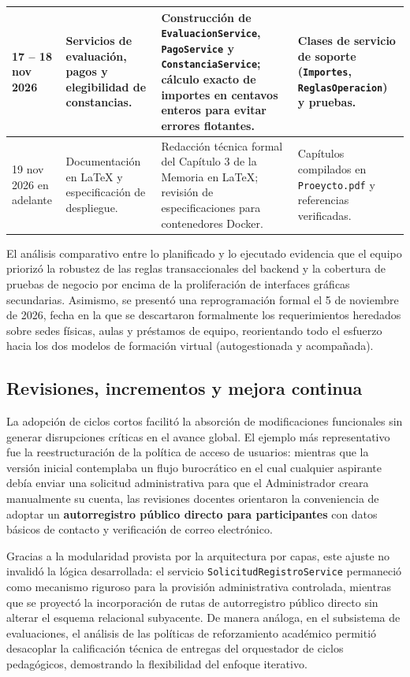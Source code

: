 \begin{table}[htbp]
\begin{tabularx}{\textwidth}{|p{2.6cm}|p{3.8cm}|X|p{3.2cm}|}
\hline
17 -- 18 nov 2026 & Servicios de evaluación, pagos y elegibilidad de constancias. & Construcción de \texttt{EvaluacionService}, \texttt{PagoService} y \texttt{ConstanciaService}; cálculo exacto de importes en centavos enteros para evitar errores flotantes. & Clases de servicio de soporte (\texttt{Importes}, \texttt{ReglasOperacion}) y pruebas. \\
\hline
19 nov 2026 en adelante & Documentación en LaTeX y especificación de despliegue. & Redacción técnica formal del Capítulo 3 de la Memoria en LaTeX; revisión de especificaciones para contenedores Docker. & Capítulos compilados en \texttt{Proeycto.pdf} y referencias verificadas. \\
\hline
\end{tabularx}
\end{table}

El análisis comparativo entre lo planificado y lo ejecutado evidencia que el equipo priorizó la robustez de las reglas transaccionales del backend y la cobertura de pruebas de negocio por encima de la proliferación de interfaces gráficas secundarias. Asimismo, se presentó una reprogramación formal el 5 de noviembre de 2026, fecha en la que se descartaron formalmente los requerimientos heredados sobre sedes físicas, aulas y préstamos de equipo, reorientando todo el esfuerzo hacia los dos modelos de formación virtual (autogestionada y acompañada).

\subsection{Revisiones, incrementos y mejora continua}
\label{sec:revisiones_mejora}

La adopción de ciclos cortos facilitó la absorción de modificaciones funcionales sin generar disrupciones críticas en el avance global. El ejemplo más representativo fue la reestructuración de la política de acceso de usuarios: mientras que la versión inicial contemplaba un flujo burocrático en el cual cualquier aspirante debía enviar una solicitud administrativa para que el Administrador creara manualmente su cuenta, las revisiones docentes orientaron la conveniencia de adoptar un \textbf{autorregistro público directo para participantes} con datos básicos de contacto y verificación de correo electrónico.

Gracias a la modularidad provista por la arquitectura por capas, este ajuste no invalidó la lógica desarrollada: el servicio \texttt{SolicitudRegistroService} permaneció como mecanismo riguroso para la provisión administrativa controlada, mientras que se proyectó la incorporación de rutas de autorregistro público directo sin alterar el esquema relacional subyacente. De manera análoga, en el subsistema de evaluaciones, el análisis de las políticas de reforzamiento académico permitió desacoplar la calificación técnica de entregas del orquestador de ciclos pedagógicos, demostrando la flexibilidad del enfoque iterativo.

